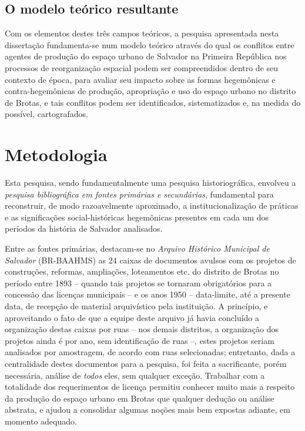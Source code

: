 \subsection{O modelo teórico resultante}
\label{subsec:modteoresult}

Com os elementos destes três campos teóricos, a pesquisa apresentada nesta dissertação fundamenta-se num modelo teórico através do qual os conflitos entre agentes de produção do espaço urbano de Salvador na Primeira República nos processos de reorganização espacial podem ser compreendidos dentro de seu contexto de época, para avaliar seu impacto sobre as formas hegemônicas e contra-hegemônicas de produção, apropriação e uso do espaço urbano no distrito de Brotas, e tais conflitos podem ser identificados, sistematizados e, na medida do possível, cartografados.

\section{Metodologia}
\label{sec:metodo}

Esta pesquisa, sendo fundamentalmente uma pesquisa historiográfica, envolveu a \textit{pesquisa bibliográfica em fontes primárias e secundárias}, fundamental para reconstruir, de modo razoavelmente aproximado, a institucionalização de práticas \cite{BERNARDO1991} e as significações social-históricas \cite{CASTORIADIS1982} hegemônicas presentes em cada um dos períodos da história de Salvador analisados.

Entre as fontes primárias, destacam-se no \textit{Arquivo Histórico Municipal de Salvador} (BR-BAAHMS) as 24 caixas de documentos avulsos com os projetos de construções, reformas, ampliações, loteamentos etc. do distrito de Brotas no período entre 1893 -- quando tais projetos se tornaram obrigatórios para a concessão das licenças municipais -- e os anos 1950 -- data-limite, até a presente data, de recepção de material arquivístico pela instituição. A princípio, e aproveitando o fato de que a equipe deste arquivo já havia concluído a organização destas caixas por ruas -- nos demais distritos, a organização dos projetos ainda é por ano, sem identificação de ruas --, estes projetos seriam analisados por amostragem, de acordo com ruas selecionadas; entretanto, dada a centralidade destes documentos para a pesquisa, foi feita a sacrificante, porém necessária, análise de \textit{todos} eles, sem qualquer exceção. Trabalhar com a totalidade dos requerimentos de licença permitiu conhecer muito mais a respeito da produção do espaço urbano em Brotas que qualquer dedução ou análise abstrata, e ajudou a consolidar algumas noções mais bem expostas adiante, em momento adequado.

